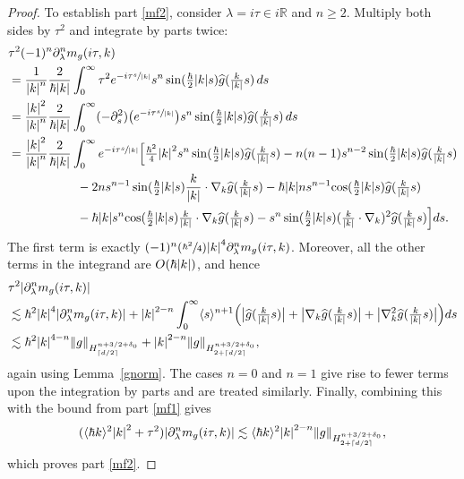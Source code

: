 \documentclass[JEP,XML,SOM,Unicode]{cedram}
\newcommand{\Psfrac}[2]{(\sfrac{#1}{#2})}
\newcommand{\babs}[1]{\bigl|#1\bigr|}
\theoremstyle{plain}
\theoremstyle{remark}
\newcommand{\bbr}[1]{\bigl(#1 \bigr)}
\newcommand{\Bbr}[1]{\Bigl(#1 \Bigr)}
\newcommand{\ak}{\abs{k}}
\newcommand{\p}{\partial}
\newcommand{\jb}[1]{\langle#1\rangle}
\newcommand{\mytextfrac}[2]{{\textstyle\frac{#1}{#2}}}
\newcommand{\R}{\mathbb{R}}
\newcommand{\lam}{\lambda}
\newcommand{\ceils}[1]{\lceil#1\rceil}
\begin{document}
\begin{proof}
To establish part \eqref{mf2}, consider \( \lambda = i\tau \in i\R \) and \( n \geq 2 \). Multiply both sides by \( \tau^2 \) and integrate by parts twice:\vspace*{-3pt}
\begin{align*}
&\tau^2(-1)^{n}\p_\lam^nm_g(i\tau,k)\\
&=\frac{1}{\ak^n}\frac{2}{ \hbar\ak}\int_0^\infty \tau^2e^{-i\tau\sfrac{s}{\ak}}s^n\sin(\mytextfrac{\hbar}{2}\ak s)\widehat g(\mytextfrac{k}{\ak}s)\,ds\\
&=\frac{\ak^2}{\ak^{n}}\frac{2}{ \hbar\ak}\int_0^\infty (-\p_s^2)\bbr{e^{-i\tau\sfrac{s}{\ak}}}s^n\sin(\mytextfrac{\hbar}{2}\ak s)\widehat g(\mytextfrac{k}{\ak}s)\,ds\\
&=\frac{\ak^2}{\ak^{n}}\frac{2}{ \hbar\ak}\int_0^\infty e^{-i\tau\sfrac{s}{\ak}}\Big[\mytextfrac{\hbar^2}{4}\ak^2s^n\sin(\mytextfrac{\hbar}{2}\ak s)\widehat g(\mytextfrac{k}{\ak}s)-n(n-1)s^{n-2}\sin(\mytextfrac{\hbar}{2}\ak s)\widehat g(\mytextfrac{k}{\ak}s)\\
&\hspace{1.95cm}-2ns^{n-1}\sin(\mytextfrac{\hbar}{2}\ak s)\frac{k}{\ak}\cdot\nabla_k\widehat g(\tfrac{k}{\ak}s)- \hbar\ak ns^{n-1}\mathrm{cos}(\mytextfrac{\hbar}{2}\ak s)\widehat g(\mytextfrac{k}{\ak}s)\\
&\hspace{1.95cm}- \hbar\ak s^n\mathrm{cos}(\mytextfrac{\hbar}{2}\ak s)\mytextfrac{k}{\ak}\cdot\nabla_k\widehat g(\mytextfrac{k}{\ak}s)-s^n\sin(\mytextfrac{\hbar}{2}\ak s)(\mytextfrac{k}{\ak}\cdot\nabla_k)^2\widehat g(\mytextfrac{k}{\ak}s)\Big]ds.
\end{align*}The first term is exactly $(-1)^n\Psfrac{\hbar^2}{4}\ak^4\p_\lam^nm_g(i\tau,k)$. Moreover, all the other terms in the integrand are $O(\hbar\ak)$, and hence
\begin{align*}
&\tau^2\abs{\p_\lam^nm_g(i\tau,k)}\\
&\lesssim \hbar^2\ak^4\abs{\p_\lam^nm_g(i\tau,k)}+\ak^{2-n}\int_0^\infty \jb{s}^{n+1}\Bbr{\babs{\widehat g(\mytextfrac{k}{\ak}s)}+\babs{\nabla_k\widehat g(\mytextfrac{k}{\ak}s)}+\babs{\nabla_k^2\widehat g(\mytextfrac{k}{\ak}s)}}ds\\
&\lesssim\hbar^2\ak^{4-n}\norm{g}_{H^{n+3/2+\delta_0}_{\ceils{d/2}}}+\ak^{2-n}\norm{g}_{H^{n+3/2+\delta_0}_{2+\ceils{d/2}}},
\end{align*}again using Lemma~\ref{gnorm}. The cases $n=0$ and $n=1$ give rise to fewer terms upon the integration by parts and are treated similarly. Finally, combining this with the bound from part \eqref{mf1} gives
\[
(\jb{\hbar k}^2 \ak^2 + \tau^2) \abs{ \partial_\lambda^n m_g(i\tau, k) } \lesssim \jb{\hbar k}^2 \ak^{2 - n}\norm{g}_{H^{n+3/2+\delta_0}_{2+\ceils{d/2}}},
\]
which proves part \eqref{mf2}.
\end{proof}
\end{document}
